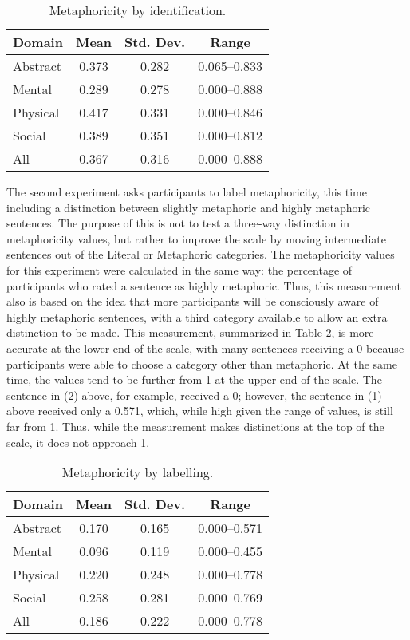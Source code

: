 \documentclass[11pt]{article}
\begin{document}
\begin{table}[h]
\begin{center}
\begin{tabular}{|l|c|c|c|}
\hline \bf Domain & \bf Mean & \bf Std. Dev. & \bf Range \\ \hline
Abstract & 0.373 & 0.282 & 0.065--0.833 \\
Mental & 0.289 & 0.278 & 0.000--0.888 \\
Physical & 0.417 & 0.331 & 0.000--0.846 \\
Social & 0.389 & 0.351 & 0.000--0.812 \\
All & 0.367 & 0.316 & 0.000--0.888 \\
\hline
\end{tabular}
\end{center}
\caption{\label{font-table} Metaphoricity by identification. }
\end{table}


The second experiment asks participants to label metaphoricity, this time including a distinction between slightly metaphoric and highly metaphoric sentences. The purpose of this is not to test a three-way distinction in metaphoricity values, but rather to improve the scale by moving intermediate sentences out of the Literal or Metaphoric categories. The metaphoricity values for this experiment were calculated in the same way: the percentage of participants who rated a sentence as highly metaphoric. Thus, this measurement also is based on the idea that more participants will be consciously aware of highly metaphoric sentences, with a third category available to allow an extra distinction to be made. This measurement, summarized in Table 2, is more accurate at the lower end of the scale, with many sentences receiving a 0 because participants were able to choose a category other than metaphoric. At the same time, the values tend to be further from 1 at the upper end of the scale. The sentence in (2) above, for example, received a 0; however, the sentence in (1) above received only a 0.571, which, while high given the range of values, is still far from 1. Thus, while the measurement makes distinctions at the top of the scale, it does not approach 1.

\begin{table}[h]
\begin{center}
\begin{tabular}{|l|c|c|c|}
\hline \bf Domain & \bf Mean & \bf Std. Dev. & \bf Range \\ \hline
Abstract & 0.170 & 0.165 & 0.000--0.571 \\
Mental & 0.096 & 0.119 & 0.000--0.455 \\
Physical & 0.220 & 0.248 & 0.000--0.778 \\
Social & 0.258 & 0.281 & 0.000--0.769 \\
All & 0.186 & 0.222 & 0.000--0.778 \\
\hline
\end{tabular}
\end{center}
\caption{\label{font-table} Metaphoricity by labelling. }
\end{table}
\end{document}
